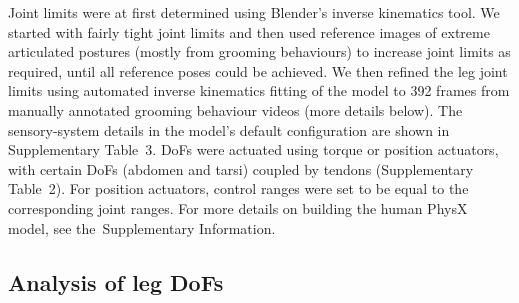 \documentclass[sn-mathphys-num]{sn-jnl}%
\theoremstyle{thmstyleone}	%
\theoremstyle{thmstyletwo}	%
\theoremstyle{thmstylethree}	%
\begin{document}
Joint limits were at first determined using Blender's inverse kinematics tool. 
We started with fairly tight joint limits and then used reference images of extreme articulated postures (mostly from grooming behaviours) to increase joint limits as required, until all reference poses could be achieved. 
We then refined the leg joint limits using automated inverse kinematics fitting of the model to 392 frames from manually annotated grooming behaviour videos (more details below). 
The sensory-system details in the model's default configuration are shown in Supplementary Table 3. 
DoFs were actuated using torque or position actuators, with certain DoFs (abdomen and tarsi) coupled by tendons (Supplementary Table 2). 
For position actuators, control ranges were set to be equal to the corresponding joint ranges. 
For more details on building the human PhysX model, see the Supplementary Information.


\subsection{Analysis of leg DoFs} \label{sec:HCP_data}
\end{document}
